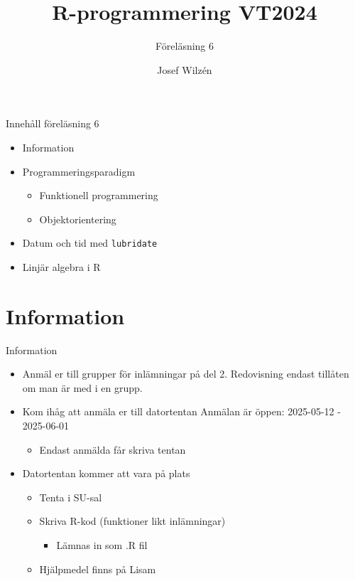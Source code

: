 \documentclass[
  11pt,
  ignorenonframetext,
  handout]{beamer}
\title{R-programmering VT2024}
\subtitle{Föreläsning 6}
\author{Josef Wilzén}
\date{}
\institute{Linköpings Universitet}
\providecommand{\tightlist}{%
  \setlength{\itemsep}{0pt}\setlength{\parskip}{0pt}}
\begin{document}
\frame{\titlepage}

\begin{frame}{Innehåll föreläsning 6}
\label{innehuxe5ll-fuxf6reluxe4sning-6}
\begin{itemize}
\tightlist
\item
  Information
\item
  Programmeringsparadigm

  \begin{itemize}
  \tightlist
  \item
    Funktionell programmering
  \item
    Objektorientering
  \end{itemize}
\item
  Datum och tid med \texttt{lubridate}
\item
  Linjär algebra i R
\end{itemize}
\end{frame}

\section{Information}\label{information}

\begin{frame}{Information}
\label{information-1}
\begin{itemize}
\tightlist
\item Anmäl er till grupper för inlämningar på del 2. Redovisning endast tillåten om man är med i en grupp.
\item
  Kom ihåg att anmäla er till datortentan Anmälan är öppen: 2025-05-12 - 2025-06-01

  \begin{itemize}
  \tightlist
  \item
    Endast anmälda får skriva tentan
  \end{itemize}
\item
  Datortentan kommer att vara på plats

  \begin{itemize}
  \tightlist
  \item
    Tenta i SU-sal
  \item
    Skriva R-kod (funktioner likt inlämningar)

    \begin{itemize}
    \tightlist
    \item
      Lämnas in som .R fil
    \end{itemize}
  \item
    Hjälpmedel finns på Lisam
  \end{itemize}
\end{itemize}
\end{frame}
\end{document}
